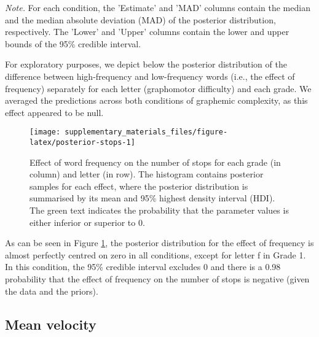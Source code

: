 \documentclass[
  11pt,
  english,
  ,doc,floatsintext]{apa6}
\begin{document}
\begin{table}[htb]
\begin{center}
\begin{threeparttable}
{}

\begin{tablenotes}[para]
\normalsize{\textit{Note.} For each condition, the 'Estimate' and 'MAD' columns contain the
    median and the median absolute deviation (MAD) of the posterior distribution,
    respectively. The 'Lower' and 'Upper' columns contain the lower and upper
    bounds of the 95\% credible interval.}
\end{tablenotes}

\end{threeparttable}
\end{center}

\end{table}

For exploratory purposes, we depict below the posterior distribution of the difference between high-frequency and low-frequency words (i.e., the effect of frequency) separately for each letter (graphomotor difficulty) and each grade. We averaged the predictions across both conditions of graphemic complexity, as this effect appeared to be null.

\begin{figure}[!htb]

{\centering \texttt{[image: supplementary\_materials\_files/figure-latex/posterior-stops-1]} 

}

\caption{Effect of word frequency on the number of stops for each grade (in column) and letter (in row). The histogram contains posterior samples for each effect, where the posterior distribution is summarised by its mean and 95\% highest density interval (HDI). The green text indicates the probability that the parameter values is either inferior or superior to 0.}\label{fig:posterior-stops}
\end{figure}

As can be seen in Figure \ref{fig:posterior-stops}, the posterior distribution for the effect of frequency is almost perfectly centred on zero in all conditions, except for letter f in Grade 1. In this condition, the 95\% credible interval excludes 0 and there is a 0.98 probability that the effect of frequency on the number of stops is negative (given the data and the priors).

\hypertarget{mean-velocity}{%
\subsection{Mean velocity}\label{mean-velocity}}
\end{document}
